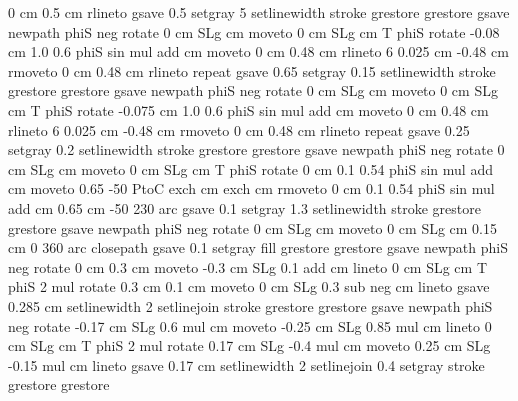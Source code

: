 {{        0 cm 0.5 cm rlineto
    gsave
         0.5 setgray
                5 setlinewidth
         stroke
    grestore
grestore
gsave
     newpath
        phiS neg rotate
        0 cm SLg cm moveto
        0 cm SLg cm T
        phiS rotate
        -0.08 cm 1.0 0.6 phiS sin mul add cm moveto
        0 cm 0.48 cm rlineto
        6 { 0.025 cm -0.48 cm rmoveto
         0 cm 0.48 cm rlineto } repeat
    gsave
         0.65 setgray
                0.15 setlinewidth
         stroke
    grestore
grestore
gsave
     newpath
        phiS neg rotate
        0 cm SLg cm moveto
        0 cm SLg cm T
        phiS rotate
        -0.075 cm 1.0 0.6 phiS sin mul add cm moveto
        0 cm 0.48 cm rlineto
        6 { 0.025 cm -0.48 cm rmoveto
         0 cm 0.48 cm rlineto } repeat
    gsave
         0.25 setgray
                0.2 setlinewidth
         stroke
    grestore
grestore
gsave
     newpath
        phiS neg rotate
        0 cm SLg cm moveto
        0 cm SLg cm T
        phiS rotate
        0 cm 0.1 0.54 phiS sin mul add cm moveto
        0.65 -50 PtoC exch cm exch cm  rmoveto
        0 cm 0.1 0.54 phiS sin mul add cm  0.65 cm -50 230 arc
    gsave
         0.1 setgray
                1.3 setlinewidth
         stroke
    grestore
grestore
gsave
     newpath
        phiS neg rotate
        0 cm SLg cm moveto
        0 cm SLg cm  0.15 cm 0 360 arc
      closepath
    gsave
         0.1 setgray
         fill
    grestore
grestore
gsave
     newpath
     phiS neg rotate
       0 cm 0.3 cm moveto
       -0.3 cm SLg 0.1 add cm lineto
       0 cm SLg cm T
        phiS 2 mul rotate
       0.3 cm 0.1 cm moveto
       0 cm SLg 0.3 sub neg cm lineto
     gsave
       0.285 cm setlinewidth
       2 setlinejoin
       \pst@usecolor\PoCFillCol
        stroke
    grestore
grestore
gsave
     newpath
     phiS neg rotate
       -0.17 cm SLg 0.6 mul cm moveto
       -0.25 cm  SLg 0.85 mul cm lineto
       0 cm SLg cm T
        phiS 2 mul rotate
       0.17 cm SLg -0.4 mul cm moveto
       0.25 cm  SLg -0.15 mul cm lineto
     gsave
       0.17 cm setlinewidth
       2 setlinejoin
       0.4 setgray
        stroke
    grestore
grestore
}}
